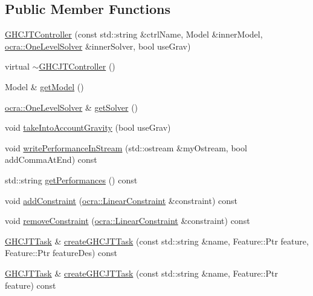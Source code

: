 \subsection*{Public Member Functions}
\begin{DoxyCompactItemize}
\item 
\hyperlink{classgocra_1_1GHCJTController_a0a9898a818ddf6e52da7d63616bd73f6}{G\+H\+C\+J\+T\+Controller} (const std\+::string \&ctrl\+Name, Model \&inner\+Model, \hyperlink{classocra_1_1OneLevelSolver}{ocra\+::\+One\+Level\+Solver} \&inner\+Solver, bool use\+Grav)
\item 
virtual \hyperlink{classgocra_1_1GHCJTController_ab20678c55e42d6f844b11e044f258e4b}{$\sim$\+G\+H\+C\+J\+T\+Controller} ()
\item 
Model \& \hyperlink{classgocra_1_1GHCJTController_ac687ebab107bcd79828564b0adad2e10}{get\+Model} ()
\item 
\hyperlink{classocra_1_1OneLevelSolver}{ocra\+::\+One\+Level\+Solver} \& \hyperlink{classgocra_1_1GHCJTController_a25b8ce2edaa3fccc38dfa81900353856}{get\+Solver} ()
\item 
void \hyperlink{classgocra_1_1GHCJTController_a755394cc7a6c038f517583faa47e7f62}{take\+Into\+Account\+Gravity} (bool use\+Grav)
\item 
void \hyperlink{classgocra_1_1GHCJTController_a71c44a633f39e843d97fc7f97dddfce4}{write\+Performance\+In\+Stream} (std\+::ostream \&my\+Ostream, bool add\+Comma\+At\+End) const
\item 
std\+::string \hyperlink{classgocra_1_1GHCJTController_add50119553cb0f5de3f5639523968939}{get\+Performances} () const
\item 
void \hyperlink{classgocra_1_1GHCJTController_a04da6a1642a2f6e79c2a6cf375ff703c}{add\+Constraint} (\hyperlink{namespaceocra_ae8b87cf4099be3efc3b410019ad2046e}{ocra\+::\+Linear\+Constraint} \&constraint) const
\item 
void \hyperlink{classgocra_1_1GHCJTController_a1ca094d27af8fe35e4196647eb5aeb4e}{remove\+Constraint} (\hyperlink{namespaceocra_ae8b87cf4099be3efc3b410019ad2046e}{ocra\+::\+Linear\+Constraint} \&constraint) const
\item 
\hyperlink{classgocra_1_1GHCJTTask}{G\+H\+C\+J\+T\+Task} \& \hyperlink{classgocra_1_1GHCJTController_a609068ec5ce8fe8afc2f8931aa116c0a}{create\+G\+H\+C\+J\+T\+Task} (const std\+::string \&name, Feature\+::\+Ptr feature, Feature\+::\+Ptr feature\+Des) const
\item 
\hyperlink{classgocra_1_1GHCJTTask}{G\+H\+C\+J\+T\+Task} \& \hyperlink{classgocra_1_1GHCJTController_a07f86a1549a1c14050b25a81c7cec210}{create\+G\+H\+C\+J\+T\+Task} (const std\+::string \&name, Feature\+::\+Ptr feature) const

\end{DoxyCompactItemize}
